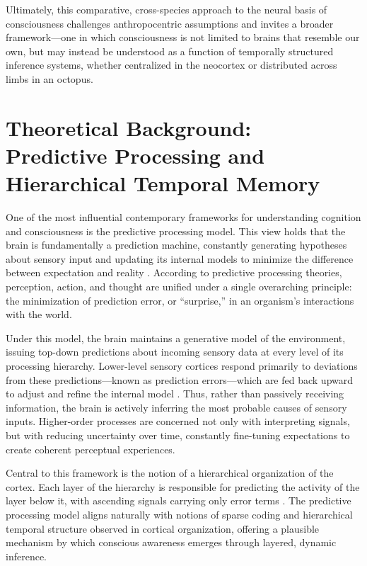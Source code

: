 \documentclass[12pt]{article}
\begin{document}
Ultimately, this comparative, cross-species approach to the neural basis of consciousness challenges anthropocentric assumptions and invites a broader framework—one in which consciousness is not limited to brains that resemble our own, but may instead be understood as a function of temporally structured inference systems, whether centralized in the neocortex or distributed across limbs in an octopus.

\section{Theoretical Background: \\ \small Predictive Processing and Hierarchical Temporal Memory}

One of the most influential contemporary frameworks for understanding cognition and consciousness is the predictive processing model. This view holds that the brain is fundamentally a prediction machine, constantly generating hypotheses about sensory input and updating its internal models to minimize the difference between expectation and reality \cite{friston2010freeenergy,clark2016surfinguncertainty}. According to predictive processing theories, perception, action, and thought are unified under a single overarching principle: the minimization of prediction error, or ``surprise,'' in an organism’s interactions with the world.

Under this model, the brain maintains a generative model of the environment, issuing top-down predictions about incoming sensory data at every level of its processing hierarchy. Lower-level sensory cortices respond primarily to deviations from these predictions—known as prediction errors—which are fed back upward to adjust and refine the internal model \cite{rao1999predictive}. Thus, rather than passively receiving information, the brain is actively inferring the most probable causes of sensory inputs. Higher-order processes are concerned not only with interpreting signals, but with reducing uncertainty over time, constantly fine-tuning expectations to create coherent perceptual experiences.

Central to this framework is the notion of a hierarchical organization of the cortex. Each layer of the hierarchy is responsible for predicting the activity of the layer below it, with ascending signals carrying only error terms \cite{friston2005theory}. The predictive processing model aligns naturally with notions of sparse coding and hierarchical temporal structure observed in cortical organization, offering a plausible mechanism by which conscious awareness emerges through layered, dynamic inference.
\end{document}
